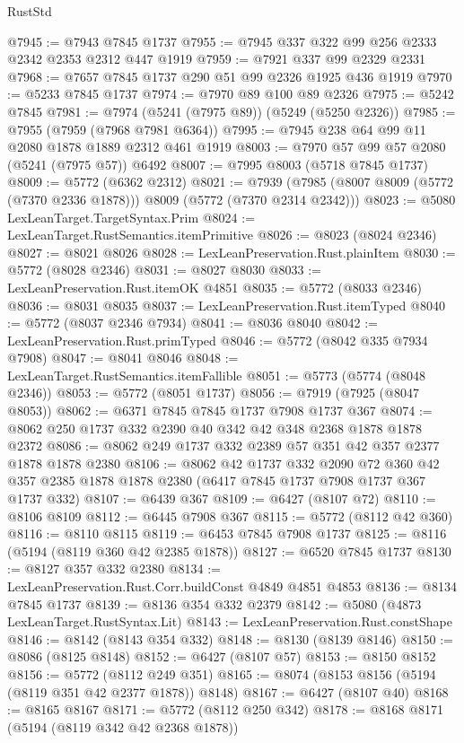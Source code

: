 \begin{lexlean}{RustStd}
\begin{coremodule}
@7945 := @7943 @7845 @1737
@7955 := @7945 @337 @322 @99 @256 @2333 @2342 @2353 @2312 @447 @1919
@7959 := @7921 @337 @99 @2329 @2331
@7968 := @7657 @7845 @1737 @290 @51 @99 @2326 @1925 @436 @1919
@7970 := @5233 @7845 @1737
@7974 := @7970 @89 @100 @89 @2326
@7975 := @5242 @7845
@7981 := @7974 (@5241 (@7975 @89)) (@5249 (@5250 @2326))
@7985 := @7955 (@7959 (@7968 @7981 @6364))
@7995 := @7945 @238 @64 @99 @11 @2080 @1878 @1889 @2312 @461 @1919
@8003 := @7970 @57 @99 @57 @2080 (@5241 (@7975 @57)) @6492
@8007 := @7995 @8003 (@5718 @7845 @1737)
@8009 := @5772 (@6362 @2312)
@8021 := @7939 (@7985 (@8007 @8009 (@5772 (@7370 @2336 @1878))) @8009 (@5772 (@7370 @2314 @2342)))
@8023 := @5080 LexLeanTarget.TargetSyntax.Prim
@8024 := LexLeanTarget.RustSemantics.itemPrimitive
@8026 := @8023 (@8024 @2346)
@8027 := @8021 @8026
@8028 := LexLeanPreservation.Rust.plainItem
@8030 := @5772 (@8028 @2346)
@8031 := @8027 @8030
@8033 := LexLeanPreservation.Rust.itemOK @4851
@8035 := @5772 (@8033 @2346)
@8036 := @8031 @8035
@8037 := LexLeanPreservation.Rust.itemTyped
@8040 := @5772 (@8037 @2346 @7934)
@8041 := @8036 @8040
@8042 := LexLeanPreservation.Rust.primTyped
@8046 := @5772 (@8042 @335 @7934 @7908)
@8047 := @8041 @8046
@8048 := LexLeanTarget.RustSemantics.itemFallible
@8051 := @5773 (@5774 (@8048 @2346))
@8053 := @5772 (@8051 @1737)
@8056 := @7919 (@7925 (@8047 @8053))
@8062 := @6371 @7845 @7845 @1737 @7908 @1737 @367
@8074 := @8062 @250 @1737 @332 @2390 @40 @342 @42 @348 @2368 @1878 @1878 @2372
@8086 := @8062 @249 @1737 @332 @2389 @57 @351 @42 @357 @2377 @1878 @1878 @2380
@8106 := @8062
    @42
    @1737
    @332
    @2090
    @72
    @360
    @42
    @357
    @2385
    @1878
    @1878
    @2380
    (@6417 @7845 @1737 @7908 @1737 @367 @1737 @332)
@8107 := @6439 @367
@8109 := @6427 (@8107 @72)
@8110 := @8106 @8109
@8112 := @6445 @7908 @367
@8115 := @5772 (@8112 @42 @360)
@8116 := @8110 @8115
@8119 := @6453 @7845 @7908 @1737
@8125 := @8116 (@5194 (@8119 @360 @42 @2385 @1878))
@8127 := @6520 @7845 @1737
@8130 := @8127 @357 @332 @2380
@8134 := LexLeanPreservation.Rust.Corr.buildConst @4849 @4851 @4853
@8136 := @8134 @7845 @1737
@8139 := @8136 @354 @332 @2379
@8142 := @5080 (@4873 LexLeanTarget.RustSyntax.Lit)
@8143 := LexLeanPreservation.Rust.constShape
@8146 := @8142 (@8143 @354 @332)
@8148 := @8130 (@8139 @8146)
@8150 := @8086 (@8125 @8148)
@8152 := @6427 (@8107 @57)
@8153 := @8150 @8152
@8156 := @5772 (@8112 @249 @351)
@8165 := @8074 (@8153 @8156 (@5194 (@8119 @351 @42 @2377 @1878)) @8148)
@8167 := @6427 (@8107 @40)
@8168 := @8165 @8167
@8171 := @5772 (@8112 @250 @342)
@8178 := @8168 @8171 (@5194 (@8119 @342 @42 @2368 @1878))

\end{coremodule}
\end{lexlean}
